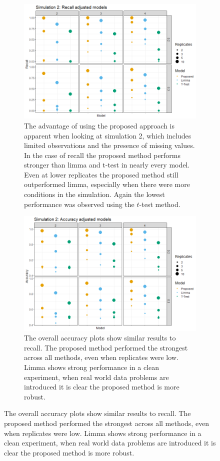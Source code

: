 \documentclass{mcp}
\begin{document}
\begin{figure}[h!]
\centering
 \begin{subfigure}{.9\textwidth}
	\includegraphics[width=.9\textwidth]{sim_new/sim3_Recall}
	\caption{The advantage of using the proposed approach is apparent when looking at simulation 2, which includes limited observations and the presence of missing values. In the case of recall the proposed method performs stronger than limma and t-test in nearly every model. Even at lower replicates the proposed method still outperformed limma, especially when there were more conditions in the simulation. Again the lowest performance was observed using the $t$-test method.}
 \end{subfigure}
 \begin{subfigure}{.9\textwidth}
	\includegraphics[width=.9\textwidth]{sim_new/sim3_Accuracy}
	\caption{The overall accuracy plots show similar results to recall. The proposed method performed the strongest across all methods, even when replicates were low. Limma shows strong performance in a clean experiment, when real world data problems are introduced it is clear the proposed method is more robust.}
 \end{subfigure}
\label{fig:sim2_recall}
\end{figure}
\end{document}
